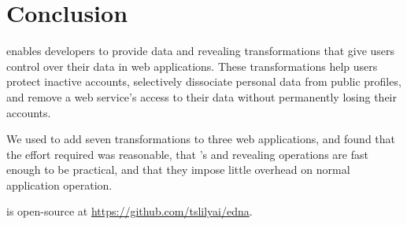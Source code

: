 
\section{Conclusion}
\label{s:concl}

%
\sys enables developers to provide data \xxing and revealing
transformations that give users control over their data in web applications.
%
These transformations help users protect inactive accounts, selectively dissociate
personal data from public profiles, and remove a web service's access to their
data without permanently losing their accounts.
%

%
We used \sys to add seven \xxing transformations to three web applications, and
found that the effort required was reasonable, that \sys's \xxing and
revealing operations are fast enough to be practical, and that they impose
little overhead on normal application operation.
%

%
\sys is open-source at \url{https://github.com/tslilyai/edna}.
%
